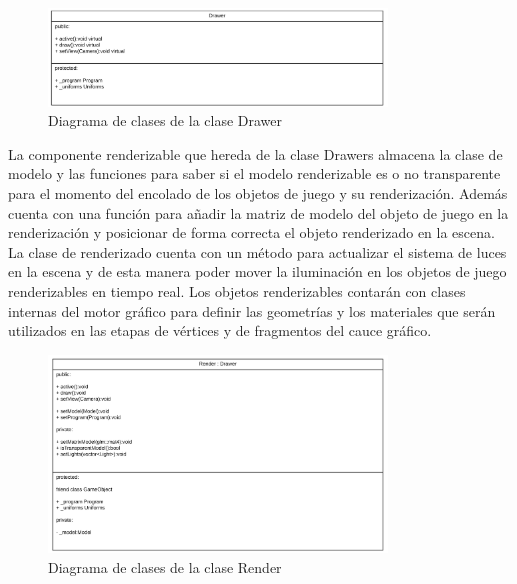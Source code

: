 \documentclass[a4paper]{book}
\begin{document}
\begin{figure}[H]
    \centering
    \includegraphics[width=9cm, keepaspectratio]{img/Drawer.png}
    \caption{Diagrama de clases de la clase Drawer}
    \label{Drawer}
\end{figure}

La componente renderizable que hereda de la clase Drawers almacena la clase de modelo y las funciones para saber si el
modelo renderizable es o no transparente para el momento del encolado de los objetos de juego y su renderización. Además
cuenta con una función para añadir la matriz de modelo del objeto de juego en la renderización y posicionar de forma
correcta el objeto renderizado en la escena. La clase de renderizado cuenta con un método para actualizar el sistema de
luces en la escena y de esta manera poder mover la iluminación en los objetos de juego renderizables en tiempo real. Los objetos renderizables
contarán con clases internas del motor gráfico para definir las geometrías y los materiales que serán utilizados en las etapas de vértices
y de fragmentos del cauce gráfico.

\begin{figure}[H]
    \centering
    \includegraphics[width=9cm, keepaspectratio]{img/Render.png}
    \caption{Diagrama de clases de la clase Render}
    \label{Render}
\end{figure}
\end{document}
